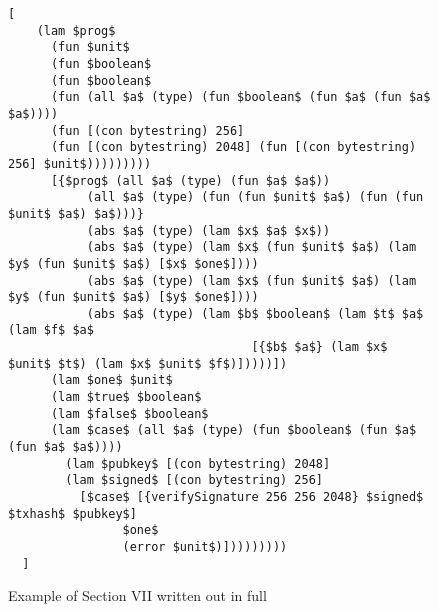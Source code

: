 \documentclass[../main.tex]{subfiles}
\begin{document}
\begin{figure*}
\begin{lstlisting}[basicstyle=\ttfamily,mathescape]
  [
    (lam $prog$
      (fun $unit$ 
      (fun $boolean$
      (fun $boolean$
      (fun (all $a$ (type) (fun $boolean$ (fun $a$ (fun $a$ $a$))))
      (fun [(con bytestring) 256]
      (fun [(con bytestring) 2048] (fun [(con bytestring) 256] $unit$)))))))))
      [{$prog$ (all $a$ (type) (fun $a$ $a$))
           (all $a$ (type) (fun (fun $unit$ $a$) (fun (fun $unit$ $a$) $a$)))}
           (abs $a$ (type) (lam $x$ $a$ $x$))
           (abs $a$ (type) (lam $x$ (fun $unit$ $a$) (lam $y$ (fun $unit$ $a$) [$x$ $one$])))
           (abs $a$ (type) (lam $x$ (fun $unit$ $a$) (lam $y$ (fun $unit$ $a$) [$y$ $one$])))
           (abs $a$ (type) (lam $b$ $boolean$ (lam $t$ $a$ (lam $f$ $a$
                                  [{$b$ $a$} (lam $x$ $unit$ $t$) (lam $x$ $unit$ $f$)]))))])
      (lam $one$ $unit$
      (lam $true$ $boolean$
      (lam $false$ $boolean$
      (lam $case$ (all $a$ (type) (fun $boolean$ (fun $a$ (fun $a$ $a$))))
        (lam $pubkey$ [(con bytestring) 2048]
        (lam $signed$ [(con bytestring) 256]
          [$case$ [{verifySignature 256 256 2048} $signed$ $txhash$ $pubkey$]
                $one$
                (error $unit$)]))))))))
  ]
\end{lstlisting}
\caption{Example of Section VII written out in full}
\label{fig:Continuized_Let_Example}
\end{figure*}





\end{document}
